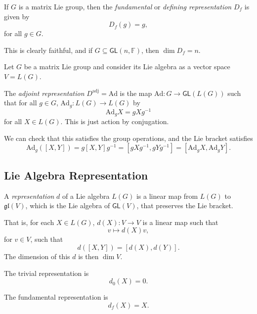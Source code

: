 \documentclass[12pt]{article}
\begin{document}
\begin{definition}
	If $G$ is a matrix Lie group, then the \emph{fundamental} or \emph{defining representation} $D_f$ is given by
	\[
	D_f(g) = g,
	\]
	for all $g \in G$.
\end{definition}

This is clearly faithful, and if $G \subseteq \mathsf{GL}(n, \mathbb{F})$, then $\dim D_f = n$.

Let $G$ be a matrix Lie group and consider its Lie algebra as a vector space $V = L(G)$.

\begin{definition}
	The \emph{adjoint representation} $D^{\mathrm{adj}} = \mathrm{Ad}$ is the map $\mathrm{Ad} : G \to \mathsf{GL}(L(G))$ such that for all $g \in G$, $\mathrm{Ad}_g : L(G) \to L(G)$ by
	\[
	\mathrm{Ad}_g X = g X g^{-1}
	\]
	for all $X \in L(G)$. This is just action by conjugation.
\end{definition}

We can check that this satisfies the group operations, and the Lie bracket satisfies
\[
	\mathrm{Ad}_g([X, Y]) = g[X, Y]g^{-1} = [gXg^{-1}, gYg^{-1}] = [\mathrm{Ad}_g X, \mathrm{Ad}_g Y].
\]

\subsection{Lie Algebra Representation}%
\label{sub:lar}

\begin{definition}
	A \emph{representation} $d$ of a Lie algebra $L(G)$ is a linear map from $L(G)$ to $\mathfrak{gl}(V)$, which is the Lie algebra of $\mathsf{GL}(V)$, that preserves the Lie bracket.

	That is, for each $X \in L(G)$, $d(X) : V \to V$ is a linear map such that
	\[
	v \mapsto d(X) v,
	\]
	for $v \in V$, such that
	\[
		d([X, Y]) = [d(X), d(Y)].
	\]
	The dimension of this $d$ is then $\dim V$.
\end{definition}


\begin{definition}
The trivial representation is
\[
d_0(X) = 0.
\]
\end{definition}

\begin{definition}
The fundamental representation is
\[
d_f(X) = X.
\]
\end{definition}
\end{document}
